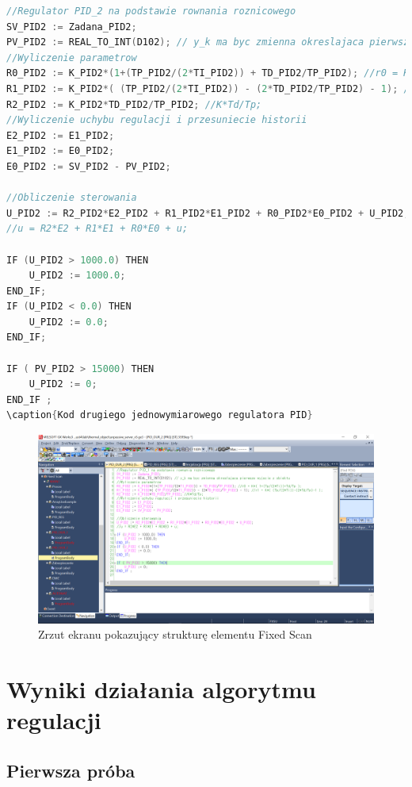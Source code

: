 \begin{lstlisting}[caption={Kod drugiego jednowymiarowego regulatora PID}, language=C]
//Regulator PID_2 na podstawie rownania roznicowego
SV_PID2 := Zadana_PID2;
PV_PID2 := REAL_TO_INT(D102); // y_k ma byc zmienna okreslajaca pierwsze wyjscie z obiektu 
//Wyliczenie parametrow
R0_PID2 := K_PID2*(1+(TP_PID2/(2*TI_PID2)) + TD_PID2/TP_PID2); //r0 = K*( 1+(Tp/(2*Ti))+Td/Tp );
R1_PID2 := K_PID2*( (TP_PID2/(2*TI_PID2)) - (2*TD_PID2/TP_PID2) - 1); //r1 = K*( (Tp/(2*Ti))-(2*Td/Tp)-1 );
R2_PID2 := K_PID2*TD_PID2/TP_PID2; //K*Td/Tp;
//Wyliczenie uchybu regulacji i przesuniecie historii
E2_PID2 := E1_PID2;
E1_PID2 := E0_PID2;
E0_PID2 := SV_PID2 - PV_PID2;

//Obliczenie sterowania
U_PID2 := R2_PID2*E2_PID2 + R1_PID2*E1_PID2 + R0_PID2*E0_PID2 + U_PID2;
//u = R2*E2 + R1*E1 + R0*E0 + u;

IF (U_PID2 > 1000.0) THEN
	U_PID2 := 1000.0;
END_IF;
IF (U_PID2 < 0.0) THEN
	U_PID2 := 0.0;
END_IF;

IF ( PV_PID2 > 15000) THEN
	U_PID2 := 0;
END_IF ;
\caption{Kod drugiego jednowymiarowego regulatora PID}
\end{lstlisting}

\begin{figure}[H]
\includegraphics[scale=0.43]{sections/thermal/DrzewkoZFolderami.png}
\caption{Zrzut ekranu pokazujący strukturę elementu Fixed Scan}
\end{figure}


\section{Wyniki działania algorytmu regulacji}
\label{thermal_pid_wyniki}

\subsection{Pierwsza próba}
\label{thermal_pid_proba_1}

